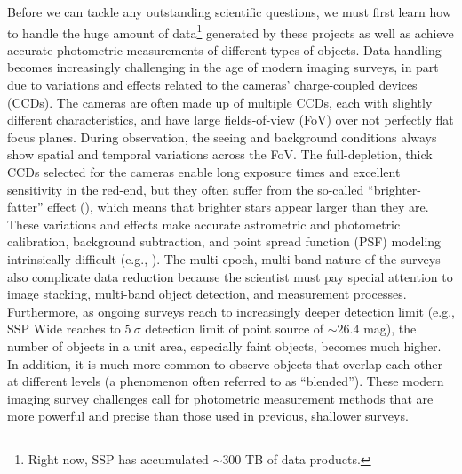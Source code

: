 \documentclass[useamsfonts]{pasj01}
\begin{document}
    Before we can tackle any outstanding scientific questions, we must first learn
    how to handle the huge amount of data\footnote{Right now, SSP has accumulated 
    ${\sim}300$ TB of data products.} generated by these projects as well as achieve
    accurate photometric measurements of different types of objects.
    Data handling becomes increasingly challenging in the age of modern imaging
    surveys, in part due to variations and effects related to the cameras' 
    charge-coupled devices (CCDs).
    The cameras are often made up of multiple CCDs, each with slightly different 
    characteristics, and have large fields-of-view (FoV) over not perfectly flat 
    focus planes.
    During observation, the seeing and background conditions always show spatial
    and temporal variations across the FoV.
    The full-depletion, thick CCDs selected for the cameras enable long exposure 
    times and excellent sensitivity in the red-end, but they often suffer from the 
    so-called ``brighter-fatter'' effect (\citealt{Antilogus2014}), which means that 
    brighter stars appear larger than they are.
    These variations and effects make accurate astrometric and photometric calibration,
    background subtraction, and point spread function (PSF) modeling intrinsically
    difficult (e.g., \citealt{Schlafly2012}).
    The multi-epoch, multi-band nature of the surveys also complicate data reduction 
    because the scientist must pay special attention to image stacking, multi-band 
    object detection, and measurement processes.
    Furthermore, as ongoing surveys reach to increasingly deeper detection limit 
    (e.g., SSP Wide reaches to $5\ \sigma$ detection limit of point source of 
    ${\sim}26.4$ mag), the number of objects in a unit area, especially faint objects,
    becomes much higher. 
    In addition, it is much more common to observe objects that overlap each other at
    different levels (a phenomenon often referred to as ``blended'').
    These modern imaging survey challenges call for photometric measurement methods 
    that are more powerful and precise than those used in previous, shallower surveys.
\end{document}
